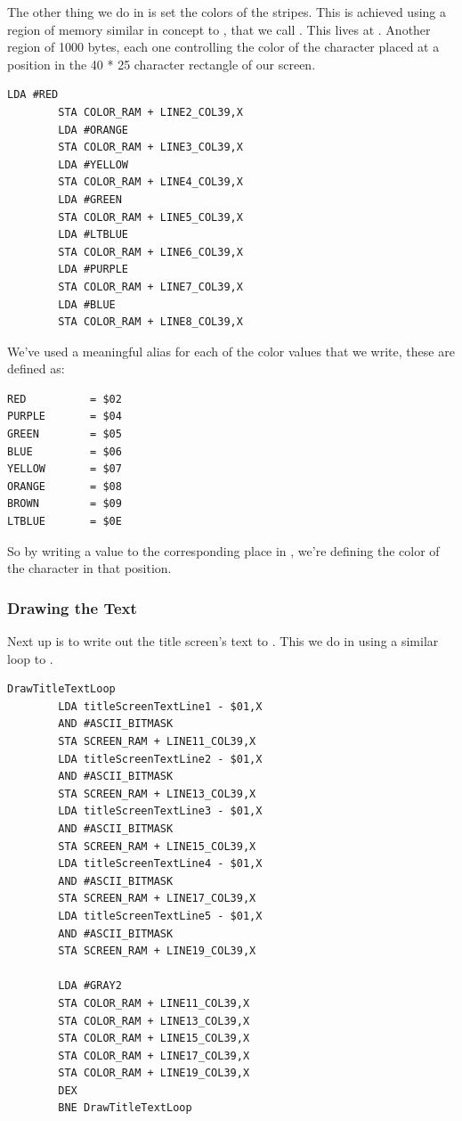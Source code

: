 

The other thing we do in  is set the colors of the stripes. This is achieved using a region of memory
similar in concept to , that we call . This lives at . Another 
region of 1000 bytes, each one controlling the color of the character placed at a position in the 40 * 25 character rectangle
of our screen.

\begin{lstlisting}[caption=In \icode{DrawStripesBehindTitle}]
        LDA #RED
        STA COLOR_RAM + LINE2_COL39,X
        LDA #ORANGE
        STA COLOR_RAM + LINE3_COL39,X
        LDA #YELLOW
        STA COLOR_RAM + LINE4_COL39,X
        LDA #GREEN
        STA COLOR_RAM + LINE5_COL39,X
        LDA #LTBLUE
        STA COLOR_RAM + LINE6_COL39,X
        LDA #PURPLE
        STA COLOR_RAM + LINE7_COL39,X
        LDA #BLUE
        STA COLOR_RAM + LINE8_COL39,X
\end{lstlisting}

We've used a meaningful alias for each of the color values that we write, these are defined as:

\begin{lstlisting}[caption=In \icode{DrawStripesBehindTitle}]
RED          = $02
PURPLE       = $04
GREEN        = $05
BLUE         = $06
YELLOW       = $07
ORANGE       = $08
BROWN        = $09
LTBLUE       = $0E
\end{lstlisting}

So by writing a value to the corresponding place in , we're defining the color of the character
in that position.



\subsubsection{Drawing the Text}

Next up is to write out the title screen's text to . This we do in 
using a similar loop to . 

\begin{lstlisting}[caption=In \icode{DrawTitleScreenText}]
DrawTitleTextLoop   
        LDA titleScreenTextLine1 - $01,X
        AND #ASCII_BITMASK
        STA SCREEN_RAM + LINE11_COL39,X
        LDA titleScreenTextLine2 - $01,X
        AND #ASCII_BITMASK
        STA SCREEN_RAM + LINE13_COL39,X
        LDA titleScreenTextLine3 - $01,X
        AND #ASCII_BITMASK
        STA SCREEN_RAM + LINE15_COL39,X
        LDA titleScreenTextLine4 - $01,X
        AND #ASCII_BITMASK
        STA SCREEN_RAM + LINE17_COL39,X
        LDA titleScreenTextLine5 - $01,X
        AND #ASCII_BITMASK
        STA SCREEN_RAM + LINE19_COL39,X

        LDA #GRAY2
        STA COLOR_RAM + LINE11_COL39,X
        STA COLOR_RAM + LINE13_COL39,X
        STA COLOR_RAM + LINE15_COL39,X
        STA COLOR_RAM + LINE17_COL39,X
        STA COLOR_RAM + LINE19_COL39,X
        DEX
        BNE DrawTitleTextLoop
\end{lstlisting}

